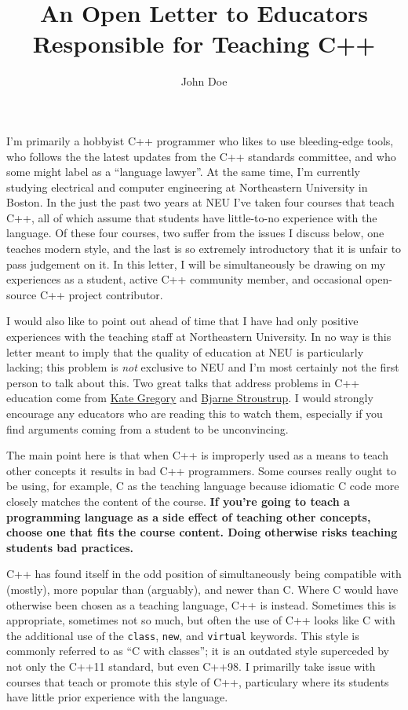 \documentclass{article}
\title{An Open Letter to Educators Responsible for Teaching C++}
\author{John Doe}
\begin{document}
\raggedright
\maketitle

I'm primarily a hobbyist C++ programmer who likes to use bleeding-edge tools, who follows the the latest updates from the C++ standards committee, and who some might label as a ``language lawyer''.  At the same time, I'm currently studying electrical and computer engineering at Northeastern University in Boston.  In the just the past two years at NEU I've taken four courses that teach C++, all of which assume that students have little-to-no experience with the language.  Of these four courses, two suffer from the issues I discuss below, one teaches modern style, and the last is so extremely introductory that it is unfair to pass judgement on it.  In this letter, I will be simultaneously be drawing on my experiences as a student, active C++ community member, and occasional open-source C++ project contributor. 

I would also like to point out ahead of time that I have had only positive experiences with the teaching staff at Northeastern University.  In no way is this letter meant to imply that the quality of education at NEU is particularly lacking; this problem is \emph{not} exclusive to NEU and I'm most certainly not the first person to talk about this.  Two great talks that address problems in C++ education come from \href{https://www.youtube.com/watch?v=YnWhqhNdYyk}{Kate Gregory} and \href{https://www.youtube.com/watch?v=fX2W3nNjJIo}{Bjarne Stroustrup}.  I would strongly encourage any educators who are reading this to watch them, especially if you find arguments coming from a student to be unconvincing.


 The main point here is that when C++ is improperly used as a means to teach other concepts it results in bad C++ programmers.  Some courses really ought to be using, for example, C as the teaching language because idiomatic C code more closely matches the content of the course.  \textbf{If you're going to teach a programming language as a side effect of teaching other concepts, choose one that fits the course content.  Doing otherwise risks teaching students bad practices.}  

C++ has found itself in the odd position of simultaneously being compatible with (mostly), more popular than (arguably), and newer than C.  Where C would have otherwise been chosen as a teaching language, C++ is instead.  Sometimes this is appropriate, sometimes not so much, but often the use of C++ looks like C with the additional use of the \lstinline{class}, \lstinline{new}, and \lstinline{virtual} keywords.  This style is commonly referred to as ``C with classes''; it is an outdated style superceded by not only the C++11 standard, but even C++98.  I primarilly take issue with courses that teach or promote this style of C++, particulary where its students have little prior experience with the language.
\end{document}
